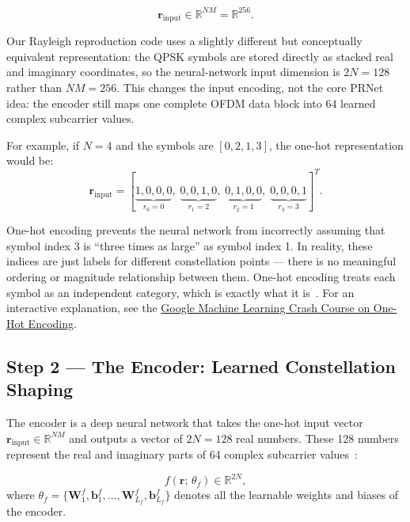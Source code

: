 \begin{equation}
    \bm{r}_{\mathrm{input}} \in \mathbb{R}^{NM} = \mathbb{R}^{256}.
    \label{eq:prnet_input}
\end{equation}

Our Rayleigh reproduction code uses a slightly different but conceptually
equivalent representation: the QPSK symbols are stored directly as stacked
real and imaginary coordinates, so the neural-network input dimension is
$2N = 128$ rather than $NM = 256$.  This changes the input encoding, not the
core PRNet idea: the encoder still maps one complete OFDM data block into
64 learned complex subcarrier values.

For example, if $N = 4$ and the symbols are $[0, 2, 1, 3]$, the one-hot
representation would be:
\[
    \bm{r}_{\mathrm{input}} = [\underbrace{1,0,0,0}_{r_0=0},\;
                               \underbrace{0,0,1,0}_{r_1=2},\;
                               \underbrace{0,1,0,0}_{r_2=1},\;
                               \underbrace{0,0,0,1}_{r_3=3}]^T.
\]

\begin{keyinsight}
    One-hot encoding prevents the neural network from incorrectly assuming
    that symbol index 3 is ``three times as large'' as symbol index 1.
    In reality, these indices are just labels for different constellation
    points --- there is no meaningful ordering or magnitude relationship
    between them.  One-hot encoding treats each symbol as an independent
    category, which is exactly what it is~\cite{kim2017novel}. For an interactive
    explanation, see the \href{https://developers.google.com/machine-learning/crash-course/categorical-data/one-hot-encoding#one-hot_encoding}{Google Machine Learning Crash Course on One-Hot Encoding}.
\end{keyinsight}


\subsection{Step 2 --- The Encoder: Learned Constellation Shaping}

The encoder is a deep neural network that takes the one-hot input vector
$\bm{r}_{\mathrm{input}} \in \mathbb{R}^{NM}$ and outputs a vector of
$2N = 128$ real numbers.  These 128 numbers represent the real and imaginary
parts of 64 complex subcarrier values~\cite{kim2017novel}:

\begin{equation}
    f(\bm{r};\,\theta_f) \in \mathbb{R}^{2N},
    \label{eq:prnet_encoder_output}
\end{equation}
where $\theta_f = \{\bm{W}_1^f, \bm{b}_1^f, \dots, \bm{W}_{L_f}^f,
\bm{b}_{L_f}^f\}$ denotes all the learnable weights and biases of
the encoder.

